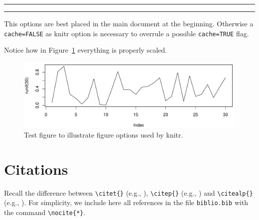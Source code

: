 \begin{table}[h!]
\centering
{}
\caption{Modeling Count Data with Specified Levels of Aleatory and Epistemic Uncertainty.}
\label{tab:count_modeling}
\end{table}




\hrule





\hrule

\bigskip 

This options are best placed in the main document at the beginning. Otherwise a \verb+cache=FALSE+ as knitr option is necessary to overrule a possible  \verb+cache=TRUE+ flag. 

\bigskip 

Notice how in Figure~\ref{f02:1} everything is properly scaled.   

\begin{figure}
\begin{knitrout}
\color{fgcolor}

{\centering \includegraphics[width=\textwidth-3cm]{figure/ch02_figunnamed-chunk-3-1} 

}


\end{knitrout}
  \caption{Test figure to illustrate figure options used by knitr.}
  \label{f02:1}
\end{figure}


\section{Citations}

Recall the difference between \verb+\citet{}+ (e.g., \citet{Chu:Geor:99}), \verb+\citep{}+ (e.g., \citep{Chu:Geor:99}) and \verb+\citealp{}+ (e.g., \citealp{Chu:Geor:99}).
For simplicity, we include here all references in the file \verb+biblio.bib+ with the command \verb+\nocite{*}+.\nocite{*}

